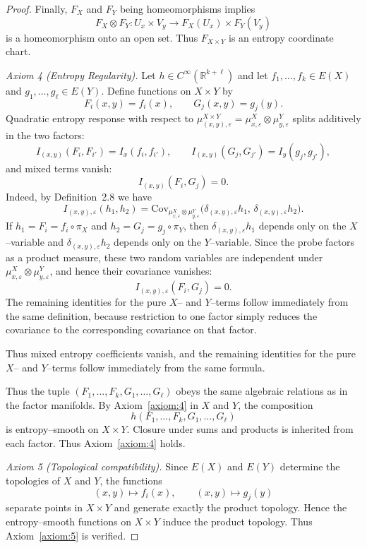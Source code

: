 \documentclass[11pt]{amsart}
\theoremstyle{definition}
\theoremstyle{remark}
\begin{document}
\begin{proof}
Finally, $F_X$ and $F_Y$ being homeomorphisms implies
\[
F_X\otimes F_Y : U_x\times V_y \longrightarrow F_X(U_x)\times F_Y(V_y)
\]
is a homeomorphism onto an open set. Thus $F_{X\times Y}$ is an entropy coordinate chart.

\medskip

\emph{Axiom 4 (Entropy Regularity).}
Let $h\in C^\infty(\mathbb{R}^{k+\ell})$ and
let $f_1,\dots,f_k\in E(X)$ and $g_1,\dots,g_\ell\in E(Y)$.
Define functions on $X\times Y$ by
\[
F_i(x,y)=f_i(x), \qquad G_j(x,y)=g_j(y).
\]
Quadratic entropy response with respect to
$\mu^{X\times Y}_{(x,y),\varepsilon}
=\mu^X_{x,\varepsilon}\otimes\mu^{Y}_{y,\varepsilon}$
splits additively in the two factors:
\[
I_{(x,y)}(F_i,F_{i'})
= I_x(f_i,f_{i'}),\qquad
I_{(x,y)}(G_j,G_{j'})
= I_y(g_j,g_{j'}),
\]
and mixed terms vanish:
\[
I_{(x,y)}(F_i,G_j)=0.
\]
Indeed, by Definition~2.8 we have
\[
I_{(x,y),\varepsilon}(h_1,h_2)=\mathrm{Cov}_{\mu^X_{x,\varepsilon}\otimes\mu^Y_{y,\varepsilon}}
\bigl(\delta_{(x,y),\varepsilon} h_1,\,\delta_{(x,y),\varepsilon} h_2\bigr).
\]
If $h_1=F_i=f_i\circ\pi_X$ and $h_2=G_j=g_j\circ\pi_Y$, then
$\delta_{(x,y),\varepsilon}h_1$ depends only on the $X$--variable and
$\delta_{(x,y),\varepsilon}h_2$ depends only on the $Y$--variable. Since the probe factors as a product measure, these two random variables are independent under
$\mu^X_{x,\varepsilon}\otimes\mu^Y_{y,\varepsilon}$, and hence their covariance vanishes:
\[
I_{(x,y),\varepsilon}(F_i,G_j)=0.
\]
The remaining identities for the pure $X$-- and $Y$--terms follow immediately from the same definition, because restriction to one factor simply reduces the covariance to the corresponding covariance on that factor.

Thus mixed entropy coefficients vanish, and the remaining identities for the pure $X$-- and $Y$--terms follow immediately from the same formula.

Thus the tuple $(F_1,\dots,F_k,G_1,\dots,G_\ell)$
obeys the same algebraic relations as in the factor manifolds.
By Axiom~\ref{axiom:4} in $X$ and $Y$, the composition
\[
h(F_1,\dots,F_k,G_1,\dots,G_\ell)
\]
is entropy–smooth on $X\times Y$. Closure under sums and products is inherited from each factor.
Thus Axiom~\ref{axiom:4} holds.

\medskip

\emph{Axiom 5 (Topological compatibility).}
Since $E(X)$ and $E(Y)$ determine the topologies of $X$ and $Y$,
the functions
\[
(x,y)\mapsto f_i(x),\qquad (x,y)\mapsto g_j(y)
\]
separate points in $X\times Y$ and generate exactly the product topology.
Hence the entropy–smooth functions on $X\times Y$ induce the product topology.
Thus Axiom~\ref{axiom:5} is verified.


\end{proof}
\end{document}
